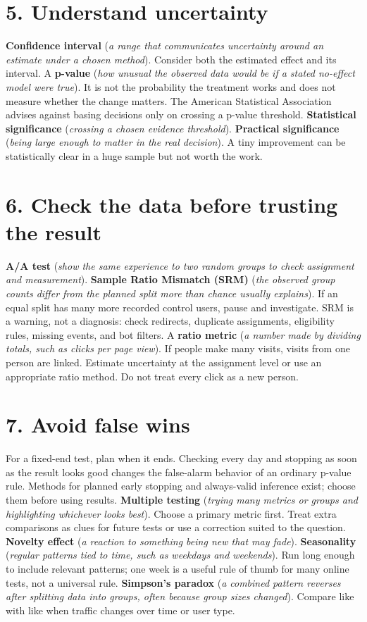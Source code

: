 \documentclass[11pt,a4paper]{article}
\newcommand{\plainterm}[2]{\textbf{#1} (\emph{#2})}
\begin{document}
\section{5. Understand uncertainty}
\plainterm{Confidence interval}{a range that communicates uncertainty around an estimate under a chosen method}. Consider both the estimated effect and its interval.
A \plainterm{p-value}{how unusual the observed data would be if a stated no-effect model were true}. It is not the probability the treatment works and does not measure whether the change matters. The American Statistical Association advises against basing decisions only on crossing a p-value threshold.
\plainterm{Statistical significance}{crossing a chosen evidence threshold}. \plainterm{Practical significance}{being large enough to matter in the real decision}. A tiny improvement can be statistically clear in a huge sample but not worth the work.

\section{6. Check the data before trusting the result}
\plainterm{A/A test}{show the same experience to two random groups to check assignment and measurement}. \plainterm{Sample Ratio Mismatch (SRM)}{the observed group counts differ from the planned split more than chance usually explains}. If an equal split has many more recorded control users, pause and investigate. SRM is a warning, not a diagnosis: check redirects, duplicate assignments, eligibility rules, missing events, and bot filters.
A \plainterm{ratio metric}{a number made by dividing totals, such as clicks per page view}. If people make many visits, visits from one person are linked. Estimate uncertainty at the assignment level or use an appropriate ratio method. Do not treat every click as a new person.

\section{7. Avoid false wins}
For a fixed-end test, plan when it ends. Checking every day and stopping as soon as the result looks good changes the false-alarm behavior of an ordinary p-value rule. Methods for planned early stopping and always-valid inference exist; choose them before using results.
\plainterm{Multiple testing}{trying many metrics or groups and highlighting whichever looks best}. Choose a primary metric first. Treat extra comparisons as clues for future tests or use a correction suited to the question.
\plainterm{Novelty effect}{a reaction to something being new that may fade}. \plainterm{Seasonality}{regular patterns tied to time, such as weekdays and weekends}. Run long enough to include relevant patterns; one week is a useful rule of thumb for many online tests, not a universal rule.
\plainterm{Simpson's paradox}{a combined pattern reverses after splitting data into groups, often because group sizes changed}. Compare like with like when traffic changes over time or user type.
\end{document}
